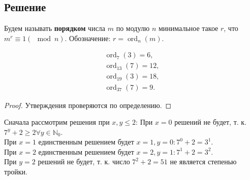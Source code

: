\documentclass[11pt]{article}
\newcounter{lem}\setcounter{lem}{0}
\def\lm{\par\smallskip\refstepcounter{lem}\textbf{\arabic{lem}}}
\newtheorem*{Lemma}{Лемма \lm}
\newcounter{th}\setcounter{th}{0}
\begin{document}
\subsection{Решение}
\label{sec:org25fff4f}
Будем называть \textbf{порядком} числа \(m\) по модулю \(n\) минимальное такое \(r\), что \(m^r \equiv 1 (\mod n)\). Обозначение: \(r = \operatorname{ord}_n(m)\).
\begin{Lemma}
\begin{gather*}
\operatorname{ord}_7(3) = 6, \\
\operatorname{ord}_{13}(7) = 12, \\
\operatorname{ord}_{19}(3) = 18, \\
\operatorname{ord}_{37}(7) = 9.
\end{gather*}
\end{Lemma}
\begin{proof}
Утверждения проверяются по определению.
\end{proof}
Сначала рассмотрим решения при $x, y \leq 2$:
При $x = 0$ решений не будет, т. к. $7^y + 2 \geq 2 \forall y \in \mathbb{N}_0$.\\
При $x = 1$ единственным решением будет $x = 1, y = 0: 7^0 + 2 = 3^1$.\\
При $x = 2$ единственным решением будет $x = 2, y = 1: 7^1 + 2 = 3^2$.\\
При $y = 2$ решений не будет, т. к. число $7^2 + 2 = 51$ не является степенью тройки. 
\end{document}
